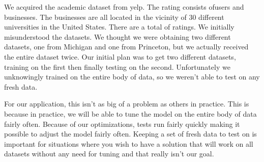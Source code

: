 We acquired the academic dataset from yelp. The rating consists of\numUserTotal users and
\numBusTotal businesses. The businesses are all located in the vicinity of $30$ different
universities in the United States. There are a total of \numRatingTotal ratings. We initially
misunderstood the datasets. We thought we were obtaining two different
datasets, one from Michigan and one from Princeton, but we actually received the
entire dataset twice. Our initial plan was to get two different datasets,
training on the first then finally testing on the second. Unfortunately we
unknowingly trained on the entire body of data, so we weren't able to test on
any fresh data. 

For our application, this isn't as big of a problem as others in practice. This
is because in practice, we will be able to tune the model on the entire body of
data fairly often. Because of our optimizations, tests run fairly quickly making
it possible to adjust the model fairly often. Keeping a set of fresh data to
test on is important for situations where you wish to have a solution that will
work on all datasets without any need for tuning and that really isn't our goal.

